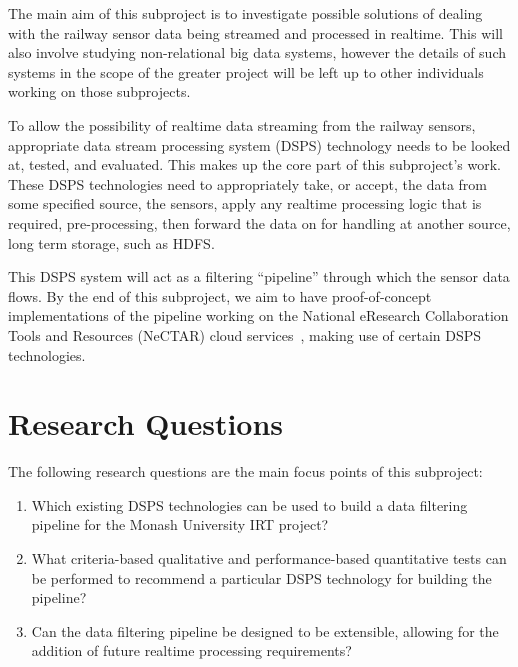 The main aim of this subproject is to investigate possible solutions of dealing with the railway sensor data being
streamed and processed in realtime. This will also involve studying non-relational big data systems, however the details
of such systems in the scope of the greater project will be left up to other individuals working on those subprojects.

To allow the possibility of realtime data streaming from the railway sensors, appropriate data stream processing system
(DSPS) technology needs to be looked at, tested, and evaluated. This makes up the core part of this subproject's work.
These DSPS technologies need to appropriately take, or accept, the data from some specified source, \eg the sensors, apply
any realtime processing logic that is required, \eg pre-processing, then forward the data on for handling at
another source, \eg long term storage, such as HDFS.

This DSPS system will act as a filtering ``pipeline'' through which the sensor data flows.
By the end of this subproject, we aim to have proof-of-concept implementations of the pipeline working on the National
eResearch Collaboration Tools and Resources (NeCTAR) cloud services~\cite{web:Nectar}, making use of certain DSPS
technologies.




\section{Research Questions} %
\label{sub:research_questions}

The following research questions are the main focus points of this subproject:

\begin{enumerate}
  \item\label{item:dsps} Which existing DSPS technologies can be used to build a data filtering pipeline for the Monash
  University IRT project?
  \item\label{item:pipeline} What criteria-based qualitative and performance-based quantitative tests can be performed
  to recommend a particular DSPS technology for building the pipeline?
  \item\label{item:recommendations} Can the data filtering pipeline be designed to be extensible, allowing for the
  addition of future realtime processing requirements?
\end{enumerate}

